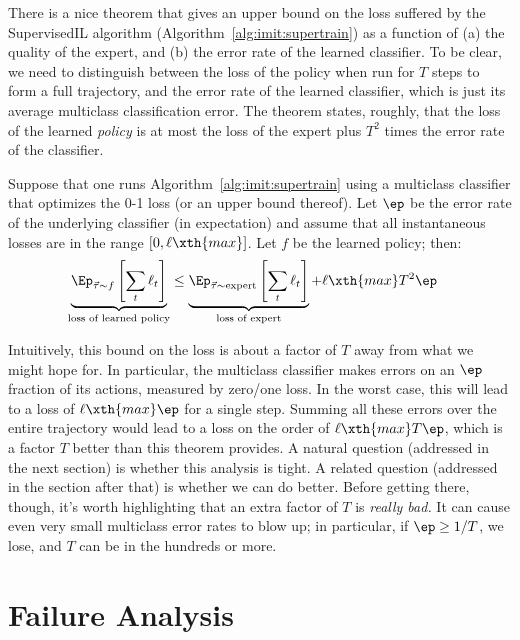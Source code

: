 There is a nice theorem that gives an upper bound on the loss suffered by the SupervisedIL algorithm (Algorithm~\ref{alg:imit:supertrain}) as a function of (a) the quality of the expert, and (b) the error rate of the learned classifier.
To be clear, we need to distinguish between the loss of the policy when run for $T$ steps to form a full trajectory, and the error rate of the learned classifier, which is just its average multiclass classification error.
The theorem states, roughly, that the loss of the learned \emph{policy} is at most the loss of the expert plus $T^2$ times the error rate of the classifier.

\begin{theorem}
  Suppose that one runs Algorithm~\ref{alg:imit:supertrain} using a multiclass classifier that optimizes the 0-1 loss (or an upper bound thereof).
  Let $\ep$ be the error rate of the underlying classifier (in expectation) and assume that all instantaneous losses are in the range $[0, \ell\xth{max}]$.
  Let $f$ be the learned policy; then:
  \begin{align}
    \underbrace{\Ep_{\vt \sim f}\left[\sum_t \ell_t\right]}_{\text{loss of learned policy}}
    & \leq
    \underbrace{\Ep_{\vt \sim \text{expert}}\left[\sum_t \ell_t\right]}_{\text{loss of expert}}
      + \ell\xth{max} T^2 \ep
  \end{align}
\end{theorem}

Intuitively, this bound on the loss is about a factor of $T$ away from what we might hope for.
In particular, the multiclass classifier makes errors on an $\ep$ fraction of its actions, measured by zero/one loss.
In the worst case, this will lead to a loss of $\ell\xth{max}\ep$ for a single step.
Summing all these errors over the entire trajectory would lead to a loss on the order of $\ell\xth{max}T\ep$, which is a factor $T$ better than this theorem provides.
A natural question (addressed in the next section) is whether this analysis is tight.
A related question (addressed in the section after that) is whether we can do better.
Before getting there, though, it's worth highlighting that an extra factor of $T$ is \emph{really bad.} It can cause even very small multiclass error rates to blow up; in particular, if $\ep \geq 1/T$, we lose, and $T$ can be in the hundreds or more.

\section{Failure Analysis}

